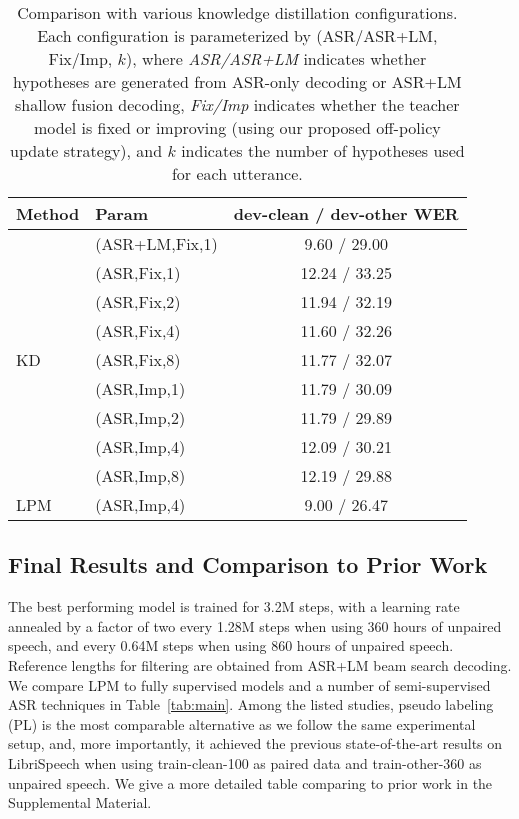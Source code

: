 \begin{table}[ht]
    \small
    \caption{Comparison with various knowledge distillation configurations. Each configuration is parameterized by (ASR/ASR+LM, Fix/Imp, $k$), where \emph{ASR/ASR+LM} indicates whether hypotheses are generated from ASR-only decoding or ASR+LM shallow fusion decoding, \emph{Fix/Imp} indicates whether the teacher model is fixed or improving (using our proposed off-policy update strategy), and $k$ indicates the number of hypotheses used for each utterance.}
    \label{tab:kd}
    \begin{center}
    \begin{tabular}{llc}
      \toprule
      Method & Param & dev-clean / dev-other WER \\
      \midrule
      \multirow{9}{*}{KD}
      & (ASR+LM,Fix,1) &  9.60 / 29.00 \\
      \cmidrule{2-3}
& (ASR,Fix,1)   &  12.24 / 33.25 \\
      & (ASR,Fix,2)   &  11.94 / 32.19 \\
      & (ASR,Fix,4)   &  11.60 / 32.26 \\
      & (ASR,Fix,8)   &  11.77 / 32.07 \\
      \cmidrule{2-3}
& (ASR,Imp,1)   &  11.79 / 30.09 \\
      & (ASR,Imp,2)   &  11.79 / 29.89 \\
      & (ASR,Imp,4)   &  12.09 / 30.21 \\
      & (ASR,Imp,8)   &  12.19 / 29.88 \\
      \midrule 
      LPM & (ASR,Imp,4) &   9.00 / 26.47\\
      \bottomrule
    \end{tabular}
    \end{center}
\end{table}



\subsection{Final Results and Comparison to Prior Work}
The best performing model is trained for 3.2M steps, with a learning rate annealed by a factor of two every 1.28M steps when using 360 hours of unpaired speech, and every 0.64M steps when using 860 hours of unpaired speech.
Reference lengths for filtering are obtained from ASR+LM beam search decoding.
We compare LPM to fully supervised models and a number of semi-supervised ASR techniques in Table~\ref{tab:main}.
Among the listed studies, pseudo labeling (PL) is the most comparable alternative as we follow the same experimental setup, and, more importantly, it achieved the previous state-of-the-art results on LibriSpeech when using train-clean-100 as paired data and train-other-360 as unpaired speech. 
We give a more detailed table comparing to prior work in the Supplemental Material.

